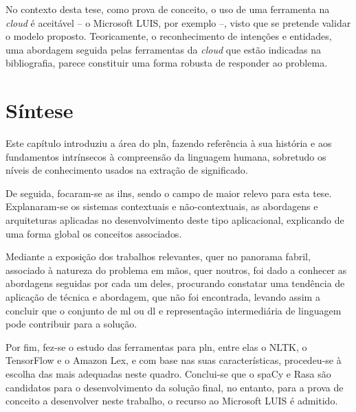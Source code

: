 No contexto desta tese, como prova de conceito, o uso de uma ferramenta na \textit{cloud} é aceitável -- o Microsoft LUIS, por exemplo --, visto que se pretende validar o modelo proposto. Teoricamente, o reconhecimento de intenções e entidades, uma abordagem seguida pelas ferramentas da \textit{cloud} que estão indicadas na bibliografia, parece constituir uma forma robusta de responder ao problema.

\section{Síntese}
\label{sec:chap03_chaptersummary}
Este capítulo introduziu a área do \gls{pln}, fazendo referência à sua história e aos fundamentos intrínsecos à compreensão da linguagem humana, sobretudo os níveis de conhecimento usados na extração de significado. 

De seguida, focaram-se as \glspl{iln}, sendo o campo de maior relevo para esta tese. Explanaram-se os sistemas contextuais e não-contextuais, as abordagens e arquiteturas aplicadas no desenvolvimento deste tipo aplicacional, explicando de uma forma global os conceitos associados.

Mediante a exposição dos trabalhos relevantes, quer no panorama fabril, associado à natureza do problema em mãos, quer noutros, foi dado a conhecer as abordagens seguidas por cada um deles, procurando constatar uma tendência de aplicação de técnica e abordagem, que não foi encontrada, levando assim a concluir que o conjunto de \gls{ml} ou \gls{dl} e representação intermediária de linguagem pode contribuir para a solução.

Por fim, fez-se o estudo das ferramentas para \gls{pln}, entre elas o NLTK, o TensorFlow e o Amazon Lex, e com base nas suas características, procedeu-se à escolha das mais adequadas neste quadro. Conclui-se que o spaCy e Rasa são candidatos para o desenvolvimento da solução final, no entanto, para a prova de conceito a desenvolver neste trabalho, o recurso ao Microsoft LUIS é admitido.